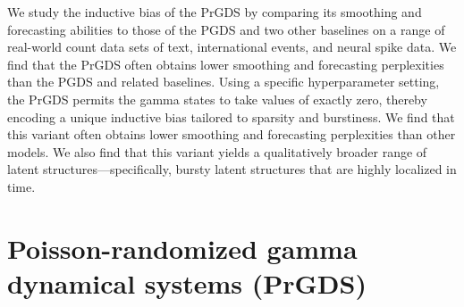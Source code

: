\documentclass{article}
\begin{document}
We study the inductive bias of the PrGDS by comparing its smoothing and forecasting abilities to those of the PGDS and two other baselines on a range of real-world count data sets of text, international events, and neural spike data. We find that the PrGDS often obtains lower smoothing and forecasting perplexities than the PGDS and related baselines. Using a specific hyperparameter setting, the PrGDS permits the gamma states to take values of exactly zero, thereby encoding a unique inductive bias tailored to sparsity and burstiness. We find that this variant often obtains lower smoothing and forecasting perplexities than other models. We also find that this variant yields a qualitatively broader range of latent structures---specifically, bursty latent structures that are highly localized in time.~



\section{Poisson-randomized gamma dynamical systems (PrGDS)}
\label{sec:prgds}
\end{document}
